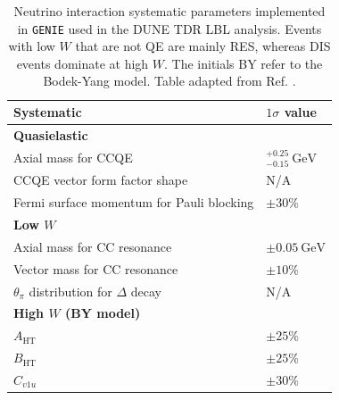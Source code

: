 \begin{table}[p!]
	\caption[Neutrino interaction systematic parameters implemented in \texttt{GENIE} used in the DUNE TDR LBL analysis.]{Neutrino interaction systematic parameters implemented in \texttt{GENIE} used in the DUNE TDR LBL analysis. Events with low $W$ that are not QE are mainly RES, whereas DIS events dominate at high $W$. The initials BY refer to the Bodek-Yang model. Table adapted from Ref. \cite{DUNE2021}.}
	\begin{center}
		\begin{small}
			\begin{tabular}{l|l}
                Systematic                                     & $1\sigma$ value                 \\[2mm] \hline
                \rule{0pt}{1.1\normalbaselineskip}\textbf{Quasielastic}                          &                                 \\[2mm]
                Axial mass for CCQE                            & $^{+0.25}_{-0.15}~\mathrm{GeV}$ \\[2mm]
                CCQE vector form factor shape                  & N/A                             \\[2mm]
                Fermi surface momentum for Pauli blocking      & $\pm 30\%$                      \\[2mm] \hline
                \rule{0pt}{1.1\normalbaselineskip}\textbf{Low $W$}                               &                                 \\[2mm]
                Axial mass for CC resonance                    & $\pm 0.05 ~ \mathrm{GeV}$       \\[2mm]
                Vector mass for CC resonance                   & $\pm 10\%$                      \\[2mm]
                $\theta_{\pi}$ distribution for $\Delta$ decay & N/A                             \\[2mm] \hline
                \rule{0pt}{1.1\normalbaselineskip}\textbf{High $W$ (BY model)}                   &                                 \\[2mm]
                $A_{\mathrm{HT}}$                              & $\pm 25\%$                      \\[2mm]
                $B_{\mathrm{HT}}$                              & $\pm 25\%$                      \\[2mm]
                $C_{v1u}$                                      & $\pm 30\%$                      \\[2mm]

\end{tabular}
\end{small}
\end{center}
\end{table}
